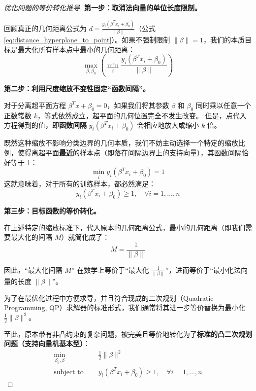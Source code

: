\documentclass[UTF8]{ctexart}
\numberwithin{equation}{section}
\begin{document}
\begin{proof}[优化问题的等价转化推导]
\textbf{第一步：取消法向量的单位长度限制。}

回顾真正的几何距离公式为 $d = \frac{y_i (\beta^T x_i + \beta_0)}{\|\beta\|}$（公式\ref{eq:distance_hyperplane_to_point}）。如果不强制限制 $\|\beta\|=1$，我们的本质目标是最大化所有样本点中最小的几何距离：
\[ \max_{\beta, \beta_0} \left( \min_{i} \frac{y_i (\beta^T x_i + \beta_0)}{\|\beta\|} \right) \]

\textbf{第二步：利用尺度缩放不变性固定“函数间隔”。}

对于分离超平面方程 $\beta^T x + \beta_0 = 0$，如果我们将其参数 $\beta$ 和 $\beta_0$ 同时乘以任意一个正数常数 $k$，等式依然成立，超平面的几何位置完全不发生改变。
但是，点代入方程得到的值，即\textbf{函数间隔} $y_i (\beta^T x_i + \beta_0)$ 会相应地放大或缩小 $k$ 倍。

既然这种缩放不影响分类边界的几何本质，我们不妨主动选择一个特定的缩放比例，使得离超平面\textbf{最近}的样本点（即落在间隔边界上的支持向量），其函数间隔恰好等于 1：
\[ \min_{i} y_i (\beta^T x_i + \beta_0) = 1 \]
这就意味着，对于所有的训练样本，都必然满足：
\[ y_i (\beta^T x_i + \beta_0) \ge 1, \quad \forall i=1,\dots,n \]

\textbf{第三步：目标函数的等价转化。}

在上述特定的缩放标准下，代入原本的几何距离公式，最小的几何距离（即我们需要最大化的间隔 $M$）就简化成了：
\[ M = \frac{1}{\|\beta\|} \]

因此，“最大化间隔 $M$” 在数学上等价于“最大化 $\frac{1}{\|\beta\|}$”，进而等价于“最小化法向量的长度 $\|\beta\|$”。

为了在最优化过程中方便求导，并且符合现成的二次规划（Quadratic Programming, QP）求解器的标准形式，我们通常将其进一步等价替换为最小化 $\frac{1}{2}\|\beta\|^2$。

至此，原本带有非凸约束的复杂问题，被完美且等价地转化为了\textbf{标准的凸二次规划问题（支持向量机基本型）}：
\begin{align}
\min_{\beta_0, \beta} \quad & \frac{1}{2} \|\beta\|^2 \label{eq:svm_primal_obj} \\
\text{subject to } \quad & y_i (\beta^T x_i + \beta_0) \ge 1, \quad \forall i=1,\dots,n \label{eq:svm_primal_const}
\end{align}
\end{proof}
\end{document}
